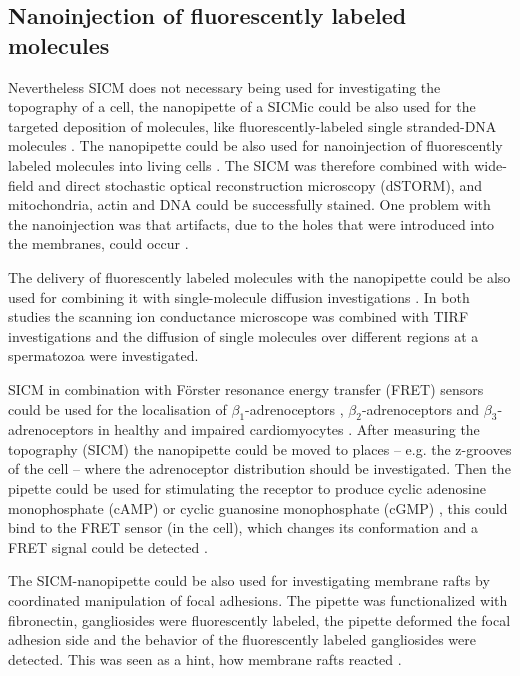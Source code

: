 \subsection{Nanoinjection of fluorescently labeled molecules}

Nevertheless SICM does not necessary being used for investigating the topography of a cell, 
the nanopipette of a SICMic could be also used for the targeted deposition of molecules, like 
fluorescently-labeled single stranded-DNA molecules \cite{Ying2002,Hennig2015}. The nanopipette 
could be also used for nanoinjection of fluorescently labeled molecules into living cells 
\cite{Hennig2015a}. The SICM was therefore combined with wide-field and direct stochastic 
optical reconstruction microscopy (dSTORM), and mitochondria, actin and DNA could be successfully 
stained. One problem with the nanoinjection was that artifacts, due to the holes that were 
introduced into the membranes, could occur \cite{Hennig2015a}.

The delivery of fluorescently labeled molecules with the nanopipette could be also used for 
combining it with single-molecule diffusion investigations \cite{Bruckbauer2007, Bruckbauer2010}. 
In both studies the scanning ion conductance microscope was combined with TIRF investigations and 
the diffusion of single molecules over different regions at a spermatozoa were investigated. 

SICM in combination with Förster resonance energy transfer (FRET) sensors could be used for
the localisation of $\beta_{1}$-adrenoceptors \cite{Wright2018}, $\beta_{2}$-adrenoceptors 
\cite{Nikolaev2010,Lyon2012,Wright2014,Wright2018} and $\beta_{3}$-adrenoceptors 
\cite{Schobesberger2020} in healthy and impaired cardiomyocytes \cite{Wright2015,Berisha2017}. 
After measuring the topography (SICM) the nanopipette could be moved to places -- e.g. the 
z-grooves of the cell \cite{Gorelik2006,Lyon2009,Miragoli2011,Lyon2012,Rivaud2017} -- where the 
adrenoceptor distribution should be investigated. Then the pipette could be used for stimulating 
the receptor to produce cyclic adenosine monophosphate (cAMP) or cyclic guanosine monophosphate 
(cGMP) \cite{Xiang2003}, this could bind to the FRET sensor (in the cell), which changes its 
conformation and a FRET signal could be detected \cite{Nikolaev2010}.

The SICM-nanopipette could be also used for investigating membrane rafts 
\cite{Simons1997,Pike2006} by coordinated manipulation of focal adhesions. The pipette was 
functionalized with fibronectin, gangliosides were fluorescently labeled, the pipette deformed the 
focal adhesion side and the behavior of the fluorescently labeled gangliosides were detected. This 
was seen as a hint, how membrane rafts reacted \cite{Fuentes2012}. 

